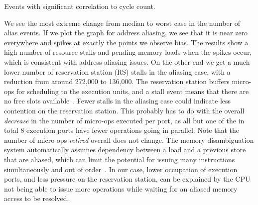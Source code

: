 \documentclass[10pt, conference, compsocconf]{IEEEtran}
\newcommand{\perfctr}[1] {
  {\lowercase{#1}}
}
\begin{document}
\begin{table}
  \caption{Events with significant correlation to cycle count.\label{tab:loopcorrelation}}
  \pgfplotstabletypeset[
    int detect, %
    col sep=comma,
    columns={Performance counter, Median, [index]3}, %
    column type=r,
    columns/Performance counter/.style={
      string type, 
      column type=l,
      column type/.add={|}{},
      postproc cell content/.append code={
        \pgfkeysalso{@cell content=\perfctr{##1}}
      }
    },
    every head row/.style={
      output empty row,
      before row={\hline
        Performance counter & Median & Spike \\ %
      },
      after row=\hline\hline
    },
    every last row/.style={after row=\hline},
    every last column/.style={column type/.add={}{|}}
  ]{bin/microkernel-comparison-haswell.csv}
\end{table}

We see the most extreme change from median to worst case in the number of alias events. 
If we plot the graph for address aliasing, we see that it is near zero everywhere and spikes at exactly the points we observe bias. 
The results show a high number of resource stalls and pending memory loads when the spikes occur, which is consistent with address aliasing issues.
On the other end we get a much lower number of reservation station (RS) stalls in the aliasing case, with a reduction from around 272,000 to 136,000.
The reservation station buffers micro-ops for scheduling to the execution units, and a stall event means that there are no free slots available~\cite[Table 19-2]{Volume3B}.
Fewer stalls in the aliasing case could indicate less contention on the reservation station.
This probably has to do with the overall \emph{decrease} in the number of micro-ops executed per port, as all but one of the in total 8 execution ports have fewer operations going in parallel.
Note that the number of micro-ops \emph{retired} overall does not change.
The memory disambiguation system automatically assumes dependency between a load and a previous store that are aliased, which can limit the potential for issuing many instructions simultaneously and out of order~\cite[Page 2-20]{OptimizationManual}.
In our case, lower occupation of execution ports, and less pressure on the reservation station, can be explained by the CPU not being able to issue more operations while waiting for an aliased memory access to be resolved.
\end{document}
